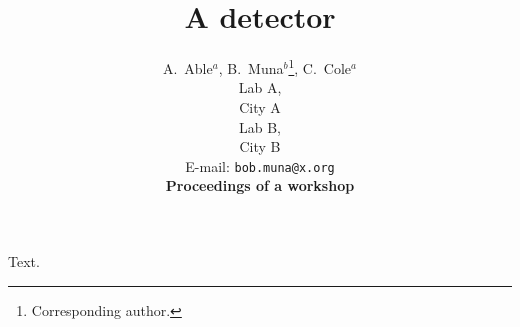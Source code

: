 \documentclass{article}
\title{A detector}
\author{A.~Able$^a$, B.~Muna$^b$\thanks{Corresponding author.}, C.~Cole$^a$\\
\llap{$^a$}Lab A,\\
  City A\\
\llap{$^b$}Lab B,\\
  City B\\
E-mail: \texttt{bob.muna@x.org}\\
\textbf{Proceedings of a workshop}}
\begin{document}
\maketitle
Text.
\end{document}
